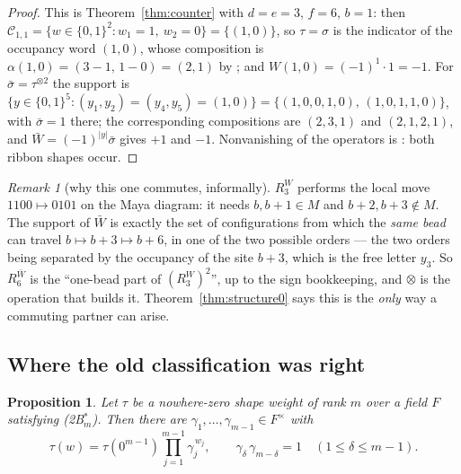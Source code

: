 \documentclass[11pt]{article}
\newtheorem{proposition}[theorem]{Proposition}
\theoremstyle{definition}
\theoremstyle{remark}
\newtheorem{remark}[theorem]{Remark}
\newcommand{\Cset}{\mathcal{C}}
\begin{document}
\begin{proof}
This is Theorem~\ref{thm:counter} with $d=e=3$, $f=6$, $b=1$: then
$\Cset_{1,1}=\{w\in\{0,1\}^{2}: w_1=1,\ w_2=0\}=\{(1,0)\}$, so $\tau=\sigma$ is the indicator
of the occupancy word $(1,0)$, whose composition is
$\alpha(1,0)=(3-1,\,1-0)=(2,1)$ by \cite[Lemma 1.3]{Q149}; and $W(1,0)=(-1)^{1}\cdot1=-1$.
For $\bar\sigma=\tau^{\otimes2}$ the support is $\{y\in\{0,1\}^{5}: (y_1,y_2)=(y_4,y_5)=(1,0)\}
=\{(1,0,0,1,0),\,(1,0,1,1,0)\}$, with $\bar\sigma=1$ there; the corresponding compositions
are $(2,3,1)$ and $(2,1,2,1)$, and $\bar W=(-1)^{|y|}\bar\sigma$ gives $+1$ and $-1$.
Nonvanishing of the operators is \cite[Lemma 3.1]{Q149}: both ribbon shapes occur.
\end{proof}

\begin{remark}[why this one commutes, informally]
$R_3^{W}$ performs the local move $1100\mapsto0101$ on the Maya diagram: it needs
$b,b+1\in M$ and $b+2,b+3\notin M$.  The support of $\bar W$ is exactly the set of
configurations from which the \emph{same bead} can travel $b\mapsto b+3\mapsto b+6$, in one
of the two possible orders --- the two orders being separated by the occupancy of the site
$b+3$, which is the free letter $y_3$.  So $R_6^{\bar W}$ is the ``one-bead part of
$(R_3^{W})^2$'', up to the sign bookkeeping, and $\otimes$ is the operation that builds it.
Theorem~\ref{thm:structure0} says this is the \emph{only} way a commuting partner can arise.
\end{remark}

\subsection{Where the old classification was right}

\begin{proposition}\label{prop:nowherezero}
Let $\tau$ be a nowhere-zero shape weight of rank $m$ over a field $F$ satisfying
\textnormal{(2B$^*_m$)}.  Then there are $\gamma_1,\dots,\gamma_{m-1}\in F^{\times}$ with
\[
  \tau(w)=\tau(0^{m-1})\prod_{j=1}^{m-1}\gamma_j^{\,w_j},\qquad
  \gamma_\delta\,\gamma_{m-\delta}=1\quad(1\le\delta\le m-1).
\]
\end{proposition}
\end{document}
